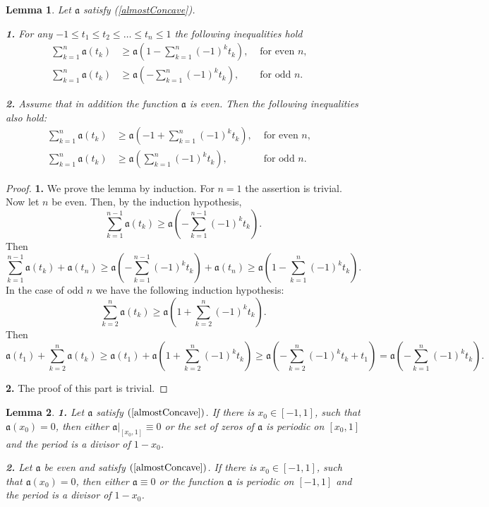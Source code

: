 \documentclass[12pt]{article}
\renewcommand{\ge}{\geqslant}
\renewcommand{\le}{\leqslant}
\newtheorem{lm}{Lemma}
\begin{document}
\begin{lm}
\label{weightSum}
Let $\mathfrak a$ satisfy (\ref{almostConcave}).

{\bf 1.} For any $-1 \le t_1 \le t_2 \le \ldots \le t_n \le 1$
the following inequalities hold
\begin{align*}
\sum_{k = 1}^n \mathfrak a(t_k) & \ge \mathfrak a( 1 - \sum_{k = 1}^n (-1)^k t_k), & \text{ for even $n$}, & \\
\sum_{k = 1}^n \mathfrak a(t_k) & \ge \mathfrak a(- \sum_{k = 1}^n (-1)^k t_k), & \text{ for odd $n$}. &
\end{align*}

{\bf 2.}
Assume that in addition the function $\mathfrak a$ is even.
Then the following inequalities also hold:
\begin{align*}
\sum_{k = 1}^n \mathfrak a(t_k) & \ge \mathfrak a(-1 + \sum_{k = 1}^n (-1)^k t_k), & \text{ for even $n$}, & \\
\sum_{k = 1}^n \mathfrak a(t_k) & \ge \mathfrak a(\sum_{k = 1}^n (-1)^k t_k), & \text{ for odd $n$}. &
\end{align*}
\end{lm}

\begin{proof}
{\bf 1.}
We prove the lemma by induction.
For $n = 1$ the assertion is trivial.
Now let $n$ be even. Then, by the induction hypothesis,
$$\sum_{k=1}^{n - 1} \mathfrak a(t_k) \ge \mathfrak a( -\sum_{k = 1}^{n - 1} (-1)^k t_k ).$$
Then
$$\sum_{k = 1}^{n - 1} \mathfrak a( t_k ) + \mathfrak a( t_n ) \ge \mathfrak a( -\sum_{k = 1}^{n - 1} (-1)^k t_k ) + \mathfrak a( t_n ) \ge
\mathfrak a( 1 - \sum_{k = 1}^{n} (-1)^k t_k ).$$
In the case of odd $n$ we have the following induction hypothesis:
$$\sum_{k=2}^n \mathfrak a(t_k) \ge \mathfrak a( 1 + \sum_{k = 2}^n (-1)^k t_k ).$$
Then
$$\mathfrak a( t_1 ) + \sum_{k = 2}^n \mathfrak a( t_k ) \ge \mathfrak a( t_1 ) + \mathfrak a( 1 + \sum_{k = 2}^{n} (-1)^k t_k ) \ge
\mathfrak a( -\sum_{k = 2}^{n} (-1)^k t_k + t_1 ) = \mathfrak a( -\sum_{k = 1}^{n} (-1)^k t_k ).$$

{\bf 2.} The proof of this part is trivial. 
\end{proof}

\begin{lm}
\label{periodicity}
{\bf 1.} Let $\mathfrak a$ satisfy $(\ref{almostConcave})$.
If there is $x_0 \in [-1, 1]$, such that $\mathfrak a(x_0) = 0$,
then either $\mathfrak a \Big|_{[x_0, 1]} \equiv 0$
or the set of zeros of $\mathfrak a$ is periodic on $[x_0, 1]$
and the period is a divisor of $1 - x_0$.

{\bf 2.} Let $\mathfrak a$ be even and satisfy $(\ref{almostConcave})$.
If there is $x_0 \in [-1, 1]$, such that $\mathfrak a(x_0) = 0$,
then either $\mathfrak a \equiv 0$
or the function $\mathfrak a$ is periodic on $[-1, 1]$
and the period is a divisor of $1 - x_0$.
\end{lm}
\end{document}
